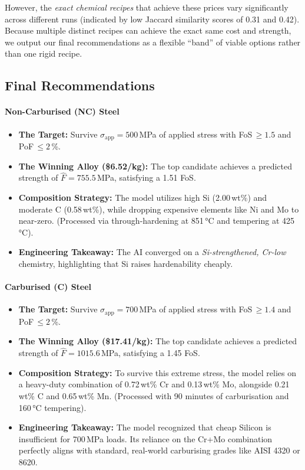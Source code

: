 \documentclass[12pt,a4paper]{article}
\begin{document}
However, the \emph{exact chemical recipes} that achieve these prices vary significantly across different runs (indicated by low Jaccard similarity scores of 0.31 and 0.42). Because multiple distinct recipes can achieve the exact same cost and strength, we output our final recommendations as a flexible ``band'' of viable options rather than one rigid recipe.

\subsection{Final Recommendations}

\paragraph{Non-Carburised (NC) Steel}
\begin{itemize}
    \item \textbf{The Target:} Survive $\sigma_{\text{app}} = 500$\,MPa of applied stress with FoS\,$\geq 1.5$ and PoF\,$\leq 2$\,\%.
    \item \textbf{The Winning Alloy (\$6.52/kg):} The top candidate achieves a predicted strength of $\hat{F} = 755.5$\,MPa, satisfying a 1.51 FoS.
    \item \textbf{Composition Strategy:} The model utilizes high Si (2.00\,wt\%) and moderate C (0.58\,wt\%), while dropping expensive elements like Ni and Mo to near-zero. (Processed via through-hardening at 851\,°C and tempering at 425\,°C).
    \item \textbf{Engineering Takeaway:} The AI converged on a \emph{Si-strengthened, Cr-low} chemistry, highlighting that Si raises hardenability cheaply.
\end{itemize}

\paragraph{Carburised (C) Steel}
\begin{itemize}
    \item \textbf{The Target:} Survive $\sigma_{\text{app}} = 700$\,MPa of applied stress with FoS\,$\geq 1.4$ and PoF\,$\leq 2$\,\%.
    \item \textbf{The Winning Alloy (\$17.41/kg):} The top candidate achieves a predicted strength of $\hat{F} = 1015.6$\,MPa, satisfying a 1.45 FoS.
    \item \textbf{Composition Strategy:} To survive this extreme stress, the model relies on a heavy-duty combination of 0.72\,wt\% Cr and 0.13\,wt\% Mo, alongside 0.21\,wt\% C and 0.65\,wt\% Mn. (Processed with 90 minutes of carburisation and 160\,°C tempering).
    \item \textbf{Engineering Takeaway:} The model recognized that cheap Silicon is insufficient for 700\,MPa loads. Its reliance on the Cr+Mo combination perfectly aligns with standard, real-world carburising grades like AISI 4320 or 8620.
\end{itemize}
\end{document}
